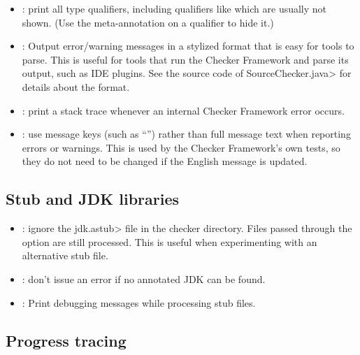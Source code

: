 \begin{itemize}
\item {}: print all type qualifiers, including
qualifiers like  which are usually not shown.
(Use the  meta-annotation on a qualifier to hide it.)

\item {}: Output error/warning messages in a
  stylized format that is easy for tools to parse.  This is useful for
  tools that run the Checker Framework and parse its output, such as IDE
  plugins.  See the source code of \<SourceChecker.java> for details about
  the format.

\item {}: print a stack trace whenever an
internal Checker Framework error occurs.

\item {}: use message keys (such as ``'')
rather than full message text when reporting errors or warnings.  This is
used by the Checker Framework's own tests, so they do not need to be
changed if the English message is updated.

\end{itemize}

\subsection{Stub and JDK libraries\label{debugging-options-libraries}}

\begin{itemize}

\item {}:
  ignore the \<jdk.astub> file in the checker directory. Files passed
  through the  option are still processed. This is useful
  when experimenting with an alternative stub file.

\item {}:
  don't issue an error if no annotated JDK can be found.

\item {}:
  Print debugging messages while processing stub files.

\end{itemize}

\subsection{Progress tracing\label{debugging-options-progress}}

